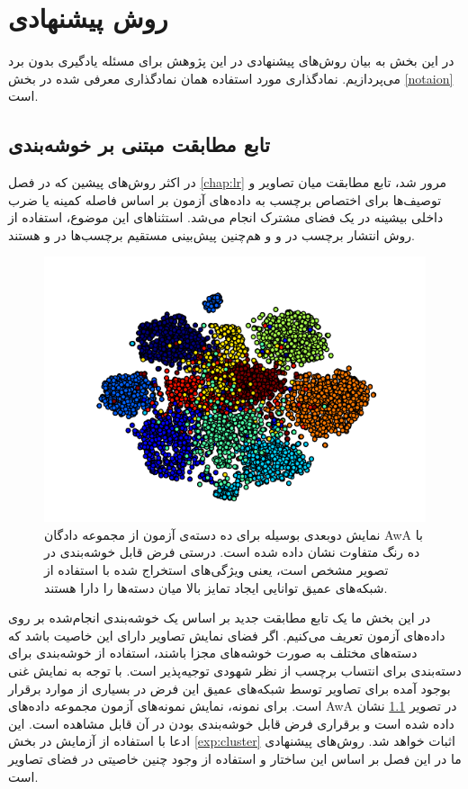 
\chapter{روش پیشنهادی} \label{chap:proposed}
در این بخش به بیان روش‌های پیشنهادی در این پژوهش برای مسئله یادگیری بدون برد می‌پردازیم. نمادگذاری مورد استفاده همان نمادگذاری معرفی شده در بخش \ref{notaion} است.
\section{ تابع مطابقت مبتنی بر خوشه‌بندی }\label{compatibility_funcion}
در اکثر روش‌های پیشین که در فصل \ref{chap:lr} مرور شد، تابع مطابقت میان تصاویر و توصیف‌ها برای اختصاص برچسب به داده‌های آزمون بر اساس فاصله کمینه یا ضرب داخلی بیشینه در یک فضای مشترک انجام می‌شد. استثناهای این موضوع، استفاده از روش انتشار برچسب در \cite{Fu2014} و \cite{Kodirov2015} و هم‌چنین پیش‌بینی مستقیم برچسب‌ها در
\cite{li15max}
و
\cite{semi15}
هستند.

\begin{figure}[th]
\centering
\includegraphics[width=0.85\linewidth]{images/awa_clusters}
\caption[نمایش دسته‌های آزمون مجموعه دادگان AwA ]{
نمایش دوبعدی بوسیله  برای ده دسته‌ی آزمون از مجموعه دادگان AwA با ده رنگ متفاوت نشان داده شده است. درستی فرض قابل خوشه‌بندی در تصویر مشخص است، یعنی ویژگی‌های استخراج شده با استفاده از شبکه‌های عمیق توانایی ایجاد تمایز بالا میان دسته‌ها را دارا هستند.
}
\label{fig:awa_clusters}
\end{figure}

در این بخش ما یک تابع مطابقت جدید بر اساس یک خوشه‌بندی انجام‌شده بر روی داده‌های آزمون تعریف می‌کنیم. اگر فضای نمایش تصاویر دارای این خاصیت باشد که دسته‌های مختلف به صورت خوشه‌های مجزا باشند، استفاده از خوشه‌بندی برای دسته‌بندی برای انتساب برچسب از نظر شهودی توجیه‌پذیر است.
با توجه به نمایش غنی بوجود آمده برای تصاویر توسط شبکه‌های عمیق این فرض در بسیاری از موارد برقرار است. برای نمونه، نمایش  نمونه‌های آزمون مجموعه داده‌های AwA در تصویر
\ref{fig:awa_clusters}
نشان داده شده است و برقراری فرض قابل خوشه‌بندی بودن در آن قابل مشاهده است. این ادعا با استفاده از آزمایش در بخش
\ref{exp:cluster}
اثبات خواهد شد. روش‌های پیشنهادی ما در این فصل بر اساس این ساختار و استفاده از وجود چنین خاصیتی در فضای تصاویر است.
